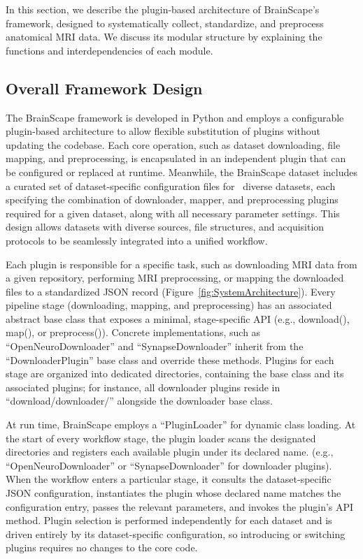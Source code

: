 In this section, we describe the plugin-based architecture of BrainScape's framework, designed to systematically 
collect, standardize, and preprocess anatomical MRI data. We discuss its modular structure by explaining 
the functions and interdependencies of each module.


\subsection{Overall Framework Design}

The BrainScape framework is developed in Python and employs a configurable plugin-based architecture to allow flexible 
substitution of plugins without updating the codebase. 
Each core operation, such as dataset downloading, file mapping, and preprocessing, is encapsulated in an independent plugin that can be configured or replaced at runtime.
Meanwhile, the BrainScape dataset includes a curated set of dataset-specific configuration files for \NumDatasets\ diverse datasets, 
each specifying the combination of downloader, mapper, and preprocessing plugins required for a given dataset, along with all necessary parameter settings.
This design allows datasets with diverse sources, file structures, and acquisition protocols to be seamlessly integrated into a unified workflow.

Each plugin is responsible for a specific task, such as downloading MRI data from a given repository, 
performing MRI preprocessing, or mapping the downloaded files to a standardized JSON record (Figure~\ref{fig:SystemArchitecture}).
Every pipeline stage (downloading, mapping, and preprocessing) has an associated abstract base class that exposes a minimal, stage-specific API 
(e.g., download(), map(), or preprocess()).
Concrete implementations, such as ``OpenNeuroDownloader'' and ``SynapseDownloader'' inherit from the ``DownloaderPlugin'' base class and override these methods. 
Plugins for each stage are organized into dedicated directories, containing the base class and its associated plugins; 
for instance, all downloader plugins reside in ``download/downloader/'' alongside the downloader base class.

At run time, BrainScape employs a ``PluginLoader'' for dynamic class loading.
At the start of every workflow stage, the plugin loader scans the designated directories 
and registers each available plugin under its declared name.
(e.g., ``OpenNeuroDownloader'' or ``SynapseDownloader'' for downloader plugins).
When the workflow enters a particular stage, it consults the dataset-specific JSON configuration, 
instantiates the plugin whose declared name matches the configuration entry, passes the relevant parameters, 
and invokes the plugin's API method. 
Plugin selection is performed independently for each dataset 
and is driven entirely by its dataset-specific configuration, 
so introducing or switching plugins requires no changes to the core code.

